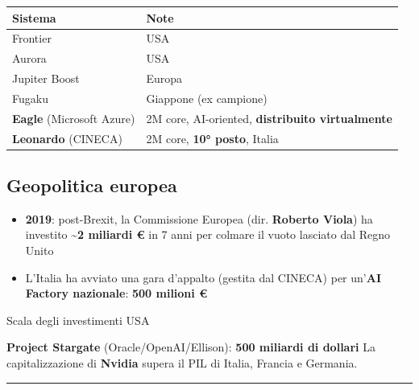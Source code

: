 \documentclass[
  italian,
  openany]{book}
\newcounter{none} %
\providecommand{\tightlist}{%
  \setlength{\itemsep}{0pt}\setlength{\parskip}{0pt}}
\begin{document}
{\def\LTcaptype{none} %
\begin{longtable}[]{@{}
  >{\raggedright\arraybackslash}p{}
  >{\raggedright\arraybackslash}p{}@{}}
\toprule\noalign{}
\begin{minipage}[b]{\linewidth}\raggedright
Sistema
\end{minipage} & \begin{minipage}[b]{\linewidth}\raggedright
Note
\end{minipage} \\
\midrule\noalign{}
\endhead
\bottomrule\noalign{}
\endlastfoot
Frontier & USA \\
Aurora & USA \\
Jupiter Boost & Europa \\
Fugaku & Giappone (ex campione) \\
\textbf{Eagle} (Microsoft Azure) & 2M core, AI-oriented,
\textbf{distribuito virtualmente} \\
\textbf{Leonardo} (CINECA) & 2M core, \textbf{10° posto}, Italia \\
\end{longtable}
}

\subsection{Geopolitica europea}\label{geopolitica-europea}

\begin{itemize}
\tightlist
\item
  \textbf{2019}: post-Brexit, la Commissione Europea (dir.
  \textbf{Roberto Viola}) ha investito \textbf{\textasciitilde2 miliardi
  €} in 7 anni per colmare il vuoto lasciato dal Regno Unito
\item
  L'Italia ha avviato una gara d'appalto (gestita dal CINECA) per
  un'\textbf{AI Factory nazionale}: \textbf{500 milioni €}
\end{itemize}

\begin{calloutnote}{Scala degli investimenti USA}

\textbf{Project Stargate} (Oracle/OpenAI/Ellison): \textbf{500 miliardi
di dollari} La capitalizzazione di \textbf{Nvidia} supera il PIL di
Italia, Francia e Germania.

\end{calloutnote}

\begin{center}\rule{0.5\linewidth}{0.5pt}\end{center}
\end{document}
